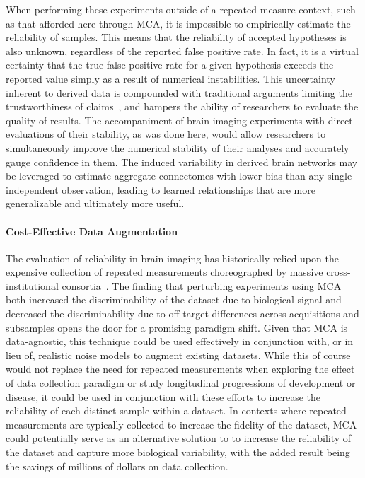 \documentclass[fleqn,10pt]{SelfArx} %
\newcommand{\new}[1]{{\color{blue} #1}}
\begin{document}
When performing these experiments outside of a repeated-measure context, such as that afforded here through MCA, it is
impossible to empirically estimate the reliability of samples. This means that the reliability of accepted hypotheses
is also unknown, regardless of the reported false positive rate. In fact, it is a virtual certainty that the true false
positive rate for a given hypothesis exceeds the reported value simply as a result of numerical instabilities. This
uncertainty inherent to derived data is compounded with traditional arguments limiting the trustworthiness of
claims~\cite{ioannidis2005most}, and hampers the ability of researchers to evaluate the quality of results. The
accompaniment of brain imaging experiments with direct evaluations of their stability, as was done here, would allow
researchers to simultaneously improve the numerical stability of their analyses and accurately gauge confidence in
them. The induced variability in derived brain networks may be leveraged to estimate aggregate connectomes with lower
bias than any single independent observation, leading to learned relationships that are more generalizable and
ultimately more useful.

\paragraph{Cost-Effective Data Augmentation}
The evaluation of reliability in brain imaging has historically relied upon the expensive collection of repeated
measurements choreographed by massive cross-institutional consortia~\cite{van2013wu,zuo2014open}. The finding that
perturbing experiments using MCA both increased the \new{discriminability} of the dataset \new{due to biological signal}
and decreased \new{the discriminability due to} off-target differences across acquisitions \new{and subsamples} opens
the door for a promising paradigm shift. Given that MCA is data-agnostic, this technique
could be used effectively in conjunction with, or in lieu of, realistic noise models to augment existing datasets.
While this of course would not replace the need for repeated measurements when exploring the effect of data collection
paradigm or study longitudinal progressions of development or disease, it could be used in conjunction with these
efforts to increase the reliability of each distinct sample within a dataset. In contexts where repeated measurements
are \new{typically} collected to increase the fidelity of the dataset, MCA could potentially \new{serve as an alternative
solution to} to increase the reliability of the dataset \new{and capture more biological variability, with the added
result being the} savings \new{of} millions of dollars on data collection. 
\end{document}
